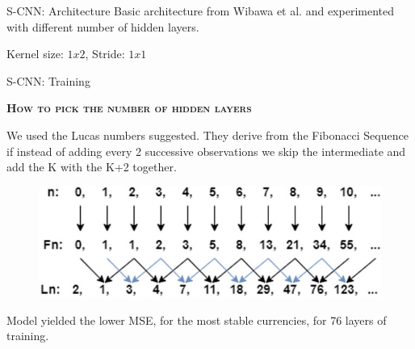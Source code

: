\documentclass[aspectratio=169, 12pt]{beamer}
\begin{document}
\begin{frame}{S-CNN: Architecture}
Basic architecture from Wibawa et al.\cite{e-cnn} and experimented with different number of hidden layers.
\begin{figure}[htbp]
\centering
\def\svgwidth{0.95\columnwidth}

\end{figure}
\begin{center}
    Kernel size: $1x2$, Stride: $1x1$
\end{center}
\end{frame}

\begin{frame}[allowframebreaks]{S-CNN: Training}
    \begin{center}
    \textsc{\textbf{How to pick the number of hidden layers}}
    \end{center}
    We used the Lucas numbers suggested. They derive from the Fibonacci Sequence if instead of adding every 2 successive observations we skip the intermediate and add the K with the K+2 together.
    \begin{figure}[htbp]
    \centering
    \includegraphics[width=0.6\columnwidth]{./plots/fibonacci.jpg}
    \end{figure}

Model yielded the lower MSE, for the most stable currencies, for 76 layers of training.


\end{frame}
\end{document}
